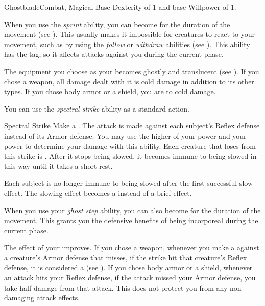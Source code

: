     \begin{feat}{Ghostblade}{Combat, Magical}
        \featpre Base Dexterity of 1 and base Willpower of 1.

         When you use the \textit{sprint} ability, you can become  for the duration of the movement (see ).
        This usually makes it impossible for creatures to react to your movement, such as by using the \textit{follow} or \textit{withdraw} abilities (see ).
        This ability has the  tag, so it affects attacks against you during the current phase.

         The equipment you choose as your  becomes ghostly and translucent (see ).
        If you chose a weapon, all damage dealt with it is cold damage in addition to its other types.
        If you chose body armor or a shield, you are  to cold damage.

         You can use the \textit{spectral strike} ability as a standard action.
        \begin{durationability}{Spectral Strike}
            \rankline
            Make a .
            The attack is made against each subject's Reflex defense instead of its Armor defense.
            You may use the higher of your  power and your  power to determine your damage with this ability.
            Each creature that loses  from this strike is  \slowed.
            After it stops being slowed, it becomes immune to being slowed in this way until it takes a short rest.

            \rankline
             Each subject is no longer immune to being slowed after the first successful slow effect.
             The slowing effect becomes a  instead of a brief effect.
        \end{durationability}

         When you use your \textit{ghost step} ability, you can also become  for the duration of the movement.
        This grants you the defensive benefits of being incorporeal during the current phase.

         The effect of your  improves.
        If you chose a weapon, whenever you make a  against a creature's Armor defense that misses, if the strike hit that creature's Reflex defense, it is considered a  (see ).
        If you chose body armor or a shield, whenever an attack hits your Reflex defense, if the attack missed your Armor defense, you take half damage from that attack.
        This does not protect you from any non-damaging attack effects.


\end{feat}
